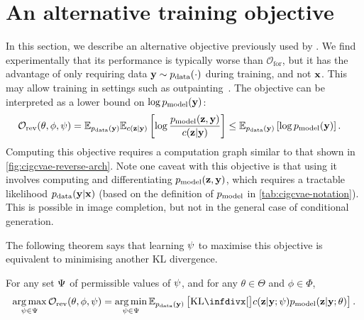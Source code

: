 \section{An alternative training objective}
\label{supp:cigcvae-ipa-r}
In this section, we describe an alternative objective previously used by
\citet{ma2018eddi}. We find experimentally that its performance is typically
worse than $\mathcal{O}_\mathrm{for}$, but it has the advantage of only
requiring data $\mathbf{y}{} \sim p_{\rm{data}}{}(\cdot)$ during training, and not $\mathbf{x}{}$.
This may allow training in settings such as
outpainting~\citep{sabini2018painting}. The objective can be interpreted as a
lower bound on $\log p_{\rm{model}}{}(\mathbf{y}{})$:
\begin{align} \label{eq:reverse-obj}
  \mathcal{O}_\text{rev}(\theta, \phi, \psi{}) &= \mathbb{E}_{p_{\rm{data}}{}(\mathbf{y}{})}\mathbb{E}_{c{}(\mathbf{z}{}|\mathbf{y}{})} \left[ \log\frac{p_{\rm{model}}{}(\mathbf{z}{},\mathbf{y}{})}{c{}(\mathbf{z}{}|\mathbf{y}{})} \right] \leq \mathbb{E}_{p_{\rm{data}}{}(\mathbf{y}{})} \left[ \log p_{\rm{model}}(\mathbf{y}{}) \right].
\end{align}
Computing this objective requires a computation graph similar to that shown in
\cref{fig:cigcvae-reverse-arch}. Note one caveat with this objective is that using it
involves computing and differentiating $p_{\rm{model}}{}(\mathbf{z}{},\mathbf{y}{})$, which requires a
tractable likelihood $p_{\rm{data}}{}(\mathbf{y}{}|\mathbf{x}{})$ (based on the definition of
$p_{\rm{model}}{}$ in \cref{tab:cigcvae-notation}). This is possible in image completion, but
not in the general case of conditional generation.

The following theorem says that learning $\psi{}$ to maximise this objective
is equivalent to minimising another KL divergence.
\begin{theorem} \label{theorem:reverse-kl} For any set $\Psi$ of
  permissible values of $\psi{}$, and for any $\theta\in\Theta$ and
  $\phi\in\Phi$,
  \begin{equation}
    \argmax_{\partphi{} \in \Partphi} \mathcal{O}_\text{rev}(\theta, \phi, \partphi{}) = \argmin_{\partphi{} \in \Partphi} \EX_{\pdata{}(\partI{})} \left[ \kl[\big] { \partq{}(\z{}|\partI{}; \partphi) }{ \pmodel{}(\z{}|\partI{}; \theta) } \right].
  \end{equation}
\end{theorem}


